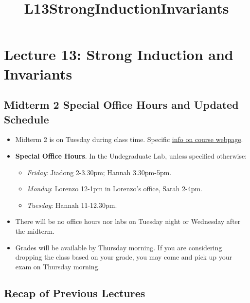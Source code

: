 \documentclass[11pt]{article}
\title{L13StrongInductionInvariants}
\providecommand{\tightlist}{%
       \setlength{\itemsep}{0pt}\setlength{\parskip}{0pt}}
\begin{document}
     
     
    \maketitle
     
     
 
     
     \section{Lecture 13: Strong Induction and
 Invariants}\label{lecture-13-strong-induction-and-invariants}
 
     \subsection{Midterm 2 Special Office Hours and Updated
 Schedule}\label{midterm-2-special-office-hours-and-updated-schedule}
 
 \begin{itemize}
 \item
   Midterm 2 is on Tuesday during class time. Specific
   \href{https://lorecchia.github.io/CS131-Combinatoric-Structures/midterm2info.html}{info
   on course webpage}.
 \item
   \textbf{Special Office Hours}. In the Undegraduate Lab, unless
   specified otherwise:
 
   \begin{itemize}
   \tightlist
   \item
     \emph{Friday}: Jiadong 2-3.30pm; Hannah 3.30pm-5pm.\\
   \item
     \emph{Monday}: Lorenzo 12-1pm in Lorenzo's office, Sarah 2-4pm.\\
   \item
     \emph{Tuesday}: Hannah 11-12.30pm.
   \end{itemize}
 \item
   There will be no office hours nor labs on Tuesday night or Wednesday
   after the midterm.
 \item
   Grades will be available by Thursday morning. If you are considering
   dropping the class based on your grade, you may come and pick up your
   exam on Thursday morning.
 \end{itemize}
 
     \subsection{Recap of Previous
 Lectures}\label{recap-of-previous-lectures}
 
\end{document}
